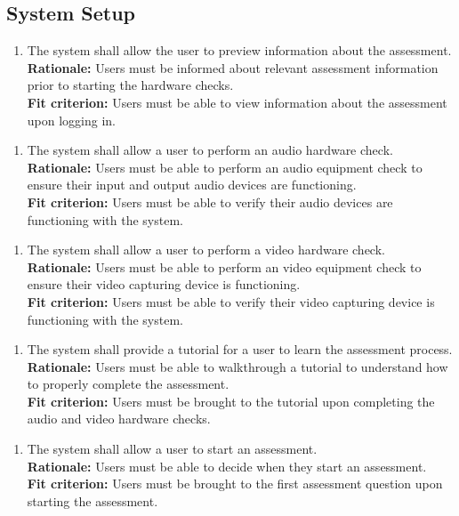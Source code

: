 \documentclass[12pt]{article}
\begin{document}
\subsection{System Setup}
\begin{enumerate}[{FR-SS}1. ]
  \item The system shall allow the user to preview information about the assessment.\\
  \textbf{Rationale: }Users must be informed about relevant assessment information prior to starting the hardware checks.\\
  \textbf{Fit criterion: }Users must be able to view information about the assessment upon logging in.
\end{enumerate}
\begin{enumerate}[{FR-SS}2. ]
  \item The system shall allow a user to perform an audio hardware check.\\
  \textbf{Rationale: }Users must be able to perform an audio equipment check to ensure their input and output audio devices are functioning.\\
  \textbf{Fit criterion: }Users must be able to verify their audio devices are functioning with the system.
\end{enumerate}
\begin{enumerate}[{FR-SS}3. ]
  \item The system shall allow a user to perform a video hardware check.\\
  \textbf{Rationale: }Users must be able to perform an video equipment check to ensure their video capturing device is functioning.\\
  \textbf{Fit criterion: }Users must be able to verify their video capturing device is functioning with the system.  
\end{enumerate}
\begin{enumerate}[{FR-SS}4. ]
  \item The system shall provide a tutorial for a user to learn the assessment process.\\
  \textbf{Rationale: }Users must be able to walkthrough a tutorial to understand how to properly complete the assessment.\\
  \textbf{Fit criterion: }Users must be brought to the tutorial upon completing the audio and video hardware checks.  
\end{enumerate}
\begin{enumerate}[{FR-SS}5. ]
  \item The system shall allow a user to start an assessment.\\
  \textbf{Rationale: }Users must be able to decide when they start an assessment.\\
  \textbf{Fit criterion: }Users must be brought to the first assessment question upon starting the assessment.  
\end{enumerate}
\end{document}
